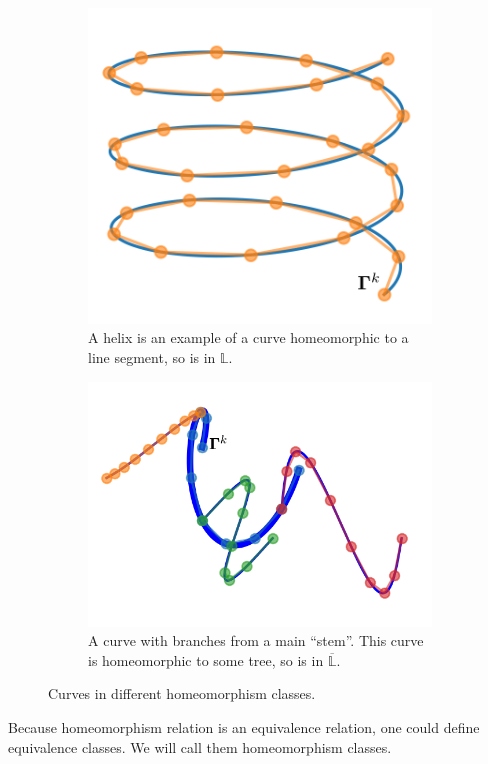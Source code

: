 \documentclass[../dissertation.tex]{subfiles}
\begin{document}
\begin{figure}[tpb]
    \centering
    \begin{subfigure}[b]{0.4\textwidth}
        \centering
        \includegraphics[width=\textwidth]{sections/otherHomeomorphismImgs/linesegment}
        \caption{A helix is an example of a curve homeomorphic to a line segment, so is in $\mathbb{L}$.}
        \label{fig: Line Segment Homeomorphism Class}
    \end{subfigure}
    \hspace{1cm}
    \begin{subfigure}[b]{0.4\textwidth}
        \centering
        \includegraphics[width=\textwidth]{sections/otherHomeomorphismImgs/branch}
        \caption{A curve with branches from a main ``stem''. This curve is homeomorphic to some tree, so is in $\overline{\mathbb{L}}$.}
        \label{fig: Bus Network}
    \end{subfigure}
    \caption{Curves in different homeomorphism classes.}
\end{figure}
Because homeomorphism relation is an equivalence relation, one could define equivalence classes.
We will call them homeomorphism classes.
\end{document}
